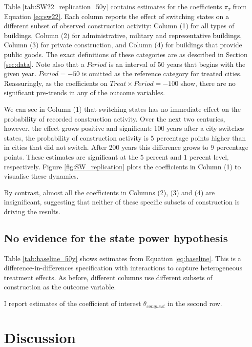 \documentclass[11pt, a4paper]{article}
\begin{document}
Table \ref{tab:SW22_replication_50y} contains estimates for the coefficients $\pi_\tau$ from Equation \eqref{eq:sw22}. Each column reports the effect of switching states on a different subset of observed construction activity: Column (1) for all types of buildings, Column (2) for administrative, military and representative buildings, Column (3) for private construction, and Column (4) for buildings that provide public goods. The exact definitions of these categories are as described in Section \ref{sec:data}. Note also that a $Period$ is an interval of 50 years that begins with the given year. $Period = -50$ is omitted as the reference category for treated cities. Reassuringly, as the coefficients on $Treat \times Period = -100$ show, there are no significant pre-trends in any of the outcome variables. 

We can see in Column (1) that switching states has no immediate effect on the probability of recorded construction activity. Over the next two centuries, however, the effect grows positive and significant: 100 years after a city switches states, the probability of construction activity is 5 percentage points higher than in cities that did not switch. After 200 years this difference grows to 9 percentage points. These estimates are significant at the 5 percent and 1 percent level, respectively. Figure \ref{fig:SW_replication} plots the coefficients in Column (1) to visualise these dynamics.

By contrast, almost all the coefficients in Columns (2), (3) and (4) are insignificant, suggesting that neither of these specific subsets of construction is driving the results. 


\subsection{No evidence for the state power hypothesis}

Table \ref{tab:baseline_50y} shows estimates from Equation \eqref{eq:baseline}. This is a difference-in-differences specification with interactions to capture heterogeneous treatment effects. As before, different columns use different subsets of construction as the outcome variable.

I report estimates of the coefficient of interest $\theta_{conquest}$ in the second row. 




\section{Discussion} \label{sec:discussion}
\end{document}
